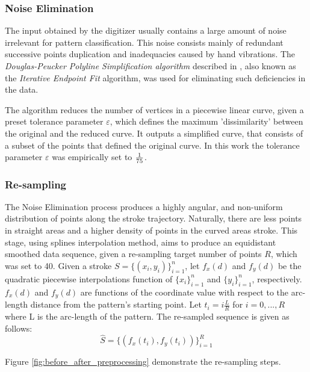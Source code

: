 \documentclass[10pt, conference, compsocconf]{IEEEtran}
\theoremstyle{definition}
\begin{document}
\subsubsection{Noise Elimination}

The input obtained by the digitizer usually contains a large amount of noise irrelevant for pattern classification. 
This noise consists mainly of redundant successive points duplication and inadequacies caused by hand vibrations. 
The \emph{Douglas-Peucker Polyline Simplification algorithm} described in \cite{douglas1973algorithms}, also known as the \emph{Iterative Endpoint Fit} algorithm, was used for eliminating such deficiencies in the data. 

The algorithm reduces the number of vertices in a piecewise linear curve, given a preset tolerance parameter $\varepsilon$, which defines the maximum 'dissimilarity' between the original and the reduced curve.
It outputs a simplified curve, that consists of a subset of the points that defined the original curve.
In this work the tolerance parameter $\varepsilon$ was empirically set to ${1 \over 75}$.

\subsubsection{Re-sampling}
The Noise Elimination process produces a highly angular, and non-uniform distribution of points along the stroke trajectory.
Naturally, there are less points in straight areas and a higher density of points in the curved areas stroke. 
This stage, using splines interpolation method, aims to produce an equidistant smoothed data sequence, given a re-sampling target number of points $R$, which was set to 40. 
Given a stroke $S=\{(x_i,y_i)\}_{i=1}^{n}$, let $f_{x}(d)$ and $f_{y}(d)$ be the quadratic piecewise interpolations function of $\{x_i\}_{i=1}^{n}$ and $\{y_i\}_{i=1}^{n}$, respectively. 
$f_{x}(d)$ and $f_{y}(d)$ are functions of the coordinate value with respect to the arc-length distance from the pattern's starting point. 
Let $t_i=i\frac{L}{R}$ for $i=0,...,R$ where L is the arc-length of the pattern.
The re-sampled sequence is given as follows:
\begin{equation}
\widehat{S}=\{(f_x(t_i),f_y(t_i))\}_{i=1}^{R}
\end{equation}

Figure \ref{fig:before_after_preprocessing} demonstrate the re-sampling steps.
\end{document}
